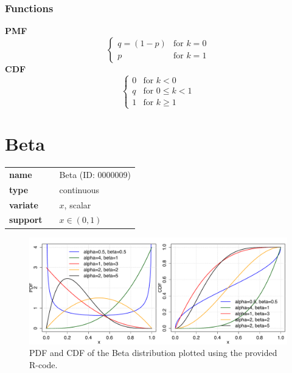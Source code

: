 \subsubsection*{Functions}

\smallskip \noindent \hspace{.2cm} \textbf{PMF} 
\begin{equation*}\begin{cases}
    q=(1-p) & \text{for }k=0 \\ p & \text{for }k=1
    \end{cases}\end{equation*}
\smallskip \noindent \hspace{.2cm} \textbf{CDF} 
\begin{equation*}\begin{cases}
    0 & \text{for }k<0 \\ q & \text{for }0\leq k<1 \\ 1 & \text{for }k\geq 1
    \end{cases}\end{equation*}
\smallskip\section*{Beta} 

  \bigskip 

\begin{tabular}{p{2cm}cl}
\textbf{name} & & Beta (ID: 0000009)\\ 
 
\textbf{type} & & continuous \\ 

\textbf{variate} & & $x$, scalar \\ 

\textbf{support} & & $x \in (0,1)$
\end{tabular}
\begin{figure}[ht!]
\centering
  \includegraphics[width=140mm]{pics/Beta_pdf_cdf.pdf}
 \caption{PDF and CDF of the Beta distribution plotted using the provided R-code.}
 \label{fig:Beta_pdf_cdf}
\end{figure}
